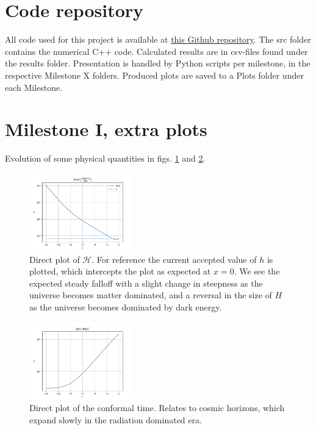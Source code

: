\begin{appendix}

\FloatBarrier
\section{Code repository}
All code used for this project is available at \href{https://github.com/ericludvigs/AST5220_Cosmology_Project}{this Github repository}.
The src folder contains the numerical C++ code. Calculated results are in csv-files found under the results folder. Presentation is handled by Python scripts per milestone, in the respective Milestone X folders. Produced plots are saved to a Plots folder under each Milestone.

\FloatBarrier
\section{Milestone I, extra plots}\label{app:milestone_1_extra_plots}

Evolution of some physical quantities in figs. \ref{fig:milestone_1_H_prime_of_x} and \ref{fig:milestone_1_eta_of_x}.

\begin{figure}[h!tb]
\centering
\includegraphics[width=0.4\textwidth]{../Milestone 1/Plots/H_prime_of_x.png}
\caption{Direct plot of $\mathcal{H}$. For reference the current accepted value of $h$ is plotted, which intercepts the plot as expected at $x=0$. We see the expected steady falloff with a slight change in steepness as the universe becomes matter dominated, and a reversal in the size of $H$ as the universe becomes dominated by dark energy.}
\label{fig:milestone_1_H_prime_of_x}
\end{figure}

\begin{figure}[h!bt]
\centering
\includegraphics[width=0.4\textwidth]{../Milestone 1/Plots/eta_of_x.png}
\caption{Direct plot of the conformal time. Relates to cosmic horizons, which expand slowly in the radiation dominated era.}
\label{fig:milestone_1_eta_of_x}
\end{figure}


\end{appendix}
